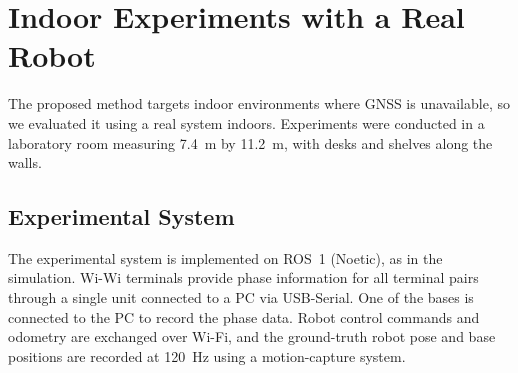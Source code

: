 \documentclass[conference]{IEEEtran}
\begin{document}



\section{Indoor Experiments with a Real Robot}
The proposed method targets indoor environments where GNSS is unavailable, so we evaluated it using a real system indoors.
Experiments were conducted in a laboratory room measuring 7.4~m by 11.2~m, with desks and shelves along the walls.

\subsection{Experimental System}
The experimental system is implemented on ROS~1 (Noetic), as in the simulation.
Wi-Wi terminals provide phase information for all terminal pairs through a single unit connected to a PC via USB-Serial.
One of the bases is connected to the PC to record the phase data.
Robot control commands and odometry are exchanged over Wi-Fi, and the ground-truth robot pose and base positions are recorded at 120~Hz using a motion-capture system.
\end{document}
